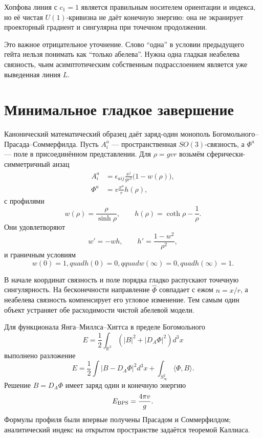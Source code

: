 \begin{nogocriterion}
Хопфова линия с $c_1=1$ является правильным носителем ориентации и
индекса, но её чистая $U(1)$-кривизна не даёт конечную энергию: она не
экранирует проекторный градиент и сингулярна при точечном продолжении.
\end{nogocriterion}

Это важное отрицательное уточнение. Слово ``одна'' в условии предыдущего
гейта нельзя понимать как ``только абелева''. Нужна одна гладкая
неабелева связность, чьим асимптотическим собственным подрасслоением
является уже выведенная линия $L$.

\section{Минимальное гладкое завершение}

Канонический математический образец даёт заряд-один монополь
Богомольного--Прасада--Соммерфилда. Пусть $A_i^a$ --- пространственная
$SO(3)$-связность, а $\Phi^a$ --- поле в присоединённом представлении.
Для $\rho=gvr$ возьмём сферически-симметричный анзац
\begin{align}
 A_i^a&=\epsilon_{aij}\frac{x^j}{gr^2}\bigl(1-w(\rho)\bigr),\\
 \Phi^a&=v\frac{x^a}{r}h(\rho),
 \label{eq:v5-hopf-bps-ansatz}
\end{align}
с профилями
\begin{equation}
 w(\rho)=\frac{\rho}{\sinh\rho},
 \qquad
 h(\rho)=\coth\rho-\frac1\rho.
 \label{eq:v5-hopf-bps-profiles}
\end{equation}
Они удовлетворяют
\begin{equation}
 w'=-wh,
 \qquad
 h'=\frac{1-w^2}{\rho^2},
 \label{eq:v5-hopf-bps-odes}
\end{equation}
и граничным условиям
\begin{equation}
 w(0)=1,quad h(0)=0,qquad
 w(\infty)=0,quad h(\infty)=1.
 \label{eq:v5-hopf-bps-boundaries}
\end{equation}

В начале координат связность и поле порядка гладко распускают точечную
сингулярность. На бесконечности направление $\widehat\Phi$ совпадает с
ежом $n=x/r$, а неабелева связность компенсирует его угловое изменение.
Тем самым один объект устраняет обе расходимости чистой абелевой модели.

Для функционала Янга--Миллса--Хиггса в пределе Богомольного
\begin{equation}
 E=\frac12\int_{\mathbb R^3}
 \left(|B|^2+|D_A\Phi|^2\right)d^3x
\end{equation}
выполнено разложение
\begin{equation}
 E=\frac12\int|B-D_A\Phi|^2d^3x
 +\int_{S^2_\infty}\!\langle\Phi,B\rangle.
 \label{eq:v5-hopf-bogomolny-square}
\end{equation}
Решение $B=D_A\Phi$ имеет заряд один и конечную энергию
\begin{equation}
 E_{\rm BPS}=\frac{4\pi v}{g}.
 \label{eq:v5-hopf-bps-energy}
\end{equation}
Формулы профиля были впервые получены Прасадом и Соммерфилдом;
аналитический индекс на открытом пространстве задаётся теоремой Каллиаса.


